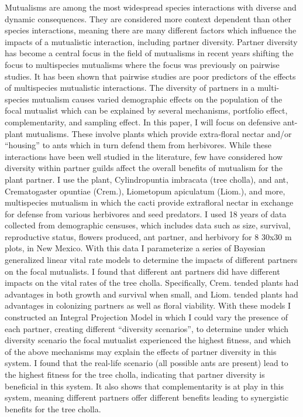 \documentclass[11pt]{article}\usepackage[sc]{mathpazo} %
\begin{document}
  Mutualisms are among the most widespread species interactions with diverse and dynamic consequences. They are considered more context dependent than other species interactions, meaning there are many different factors which influence the impacts of a mutualistic interaction, including partner diversity. Partner diversity has become a central focus in the field of mutualisms in recent years shifting the focus to multispecies mutualisms where the focus was previously on pairwise studies. It has been shown that pairwise studies are poor predictors of the effects of multispecies mutualistic interactions. The diversity of partners in a multi-species mutualism causes varied demographic effects on the population of the focal mutualist which can be explained by several mechanisms, portfolio effect, complementarity, and sampling effect. In this paper, I will focus on defensive ant-plant mutualisms. These involve plants which provide extra-floral nectar and/or “housing” to ants which in turn defend them from herbivores. While these interactions have been well studied in the literature, few have considered how diversity within partner guilds affect the overall benefits of mutualism for the plant partner.   
  I use the plant, Cylindropuntia imbracata (tree cholla), and ant, Crematogaster opuntiae (Crem.), Liometopum apiculatum (Liom.), and more, multispecies mutualism in which the cacti provide extrafloral nectar in exchange for defense from various herbivores and seed predators. I used 18 years of data collected from demographic censuses, which includes data such as size, survival, reproductive status, flowers produced, ant partner, and herbivory for 8 30x30 m plots, in New Mexico. With this data I parameterize a series of Bayesian generalized linear vital rate models to determine the impacts of different partners on the focal mutualists. I found that different ant partners did have different impacts on the vital rates of the tree cholla. Specifically, Crem. tended plants had advantages in both growth and survival when small, and Liom. tended plants had advantages in colonizing partners as well as floral viability. With these models I constructed an Integral Projection Model in which I could vary the presence of each partner, creating different “diversity scenarios”, to determine under which diversity scenario the focal mutualist experienced the highest fitness, and which of the above mechanisms may explain the effects of partner diversity in this system. I found that the real-life scenario (all possible ants are present) lead to the highest fitness for the tree cholla, indicating that partner diversity is beneficial in this system. It also shows that complementarity is at play in this system, meaning different partners offer different benefits leading to synergistic benefits for the tree cholla. 
\end{document}
